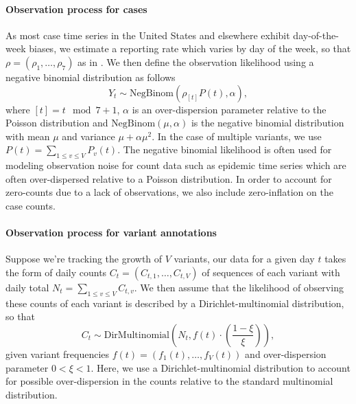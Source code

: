 \paragraph{Observation process for cases}%

As most case time series in the United States and elsewhere exhibit day-of-the-week biases, we estimate a reporting rate which varies by day of the week, so that $\rho = (\rho_{1}, \ldots, \rho_{7})$ as in \cite{Abbott2020}.
We then define the observation likelihood using a negative binomial distribution as follows
\begin{equation}
  Y_{t} \sim \text{NegBinom}(\rho_{[t]} P(t),  \alpha),
\end{equation}
where $[t] = t \mod 7 + 1$, $\alpha$ is an over-dispersion parameter relative to the Poisson distribution and $\text{NegBinom}(\mu, \alpha)$ is the negative binomial distribution with mean $\mu$ and variance  $\mu + \alpha\mu^{2}$. In the case of multiple variants, we use $P(t) = \sum_{1\leq v \leq V} P_{v}(t)$.
The negative binomial likelihood is often used for modeling observation noise for count data such as epidemic time series which are often over-dispersed relative to a Poisson distribution.
In order to account for zero-counts due to a lack of observations, we also include zero-inflation on the case counts.

\paragraph{Observation process for variant annotations}%

Suppose we're tracking the growth of $V$ variants, our data for a given day $t$ takes the form of daily counts $C_{t} = (C_{t,1}, \ldots, C_{t,V})$ of sequences of each variant with daily total $N_{t} = \sum_{1\leq v \leq V} C_{t, v}$.
We then assume that the likelihood of observing these counts of each variant is described by a Dirichlet-multinomial distribution, so that
\begin{equation}
    C_{t} \sim \text{DirMultinomial}\left(N_{t}, f(t)\cdot \left(\frac{1-\xi}{\xi}\right)\right),
\end{equation}
given variant frequencies $f(t) = (f_{1}(t), \ldots, f_{V}(t))$ and over-dispersion parameter $0<\xi<1$.
Here, we use a Dirichlet-multinomial distribution to account for possible over-dispersion in the counts relative to the standard multinomial distribution.



